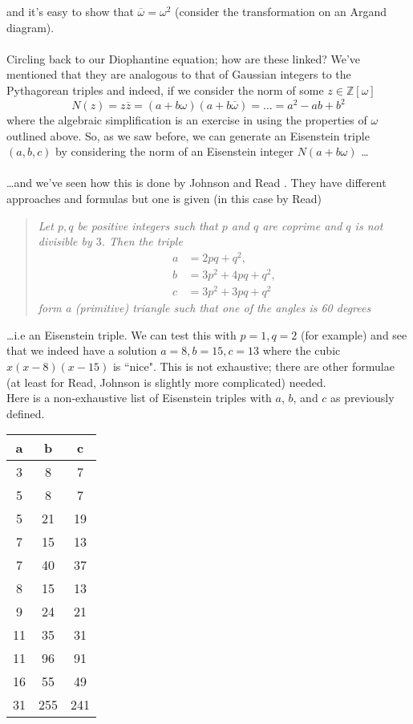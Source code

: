 \documentclass[12pt]{article}
\newcommand*\conj[1]{\overline{#1}}
\newcommand{\Z}{\mathbb{Z}}
\begin{document}
and it's easy to show that $\conj{\omega} = \omega^2$ (consider the transformation on an Argand diagram).\\\\
Circling back to our Diophantine equation; how are these linked? We've mentioned that they are analogous to that of Gaussian integers to the Pythagorean triples and indeed, if we consider the norm of some $z \in \Z[\omega]$
\begin{equation*}
    N(z) = z\conj{z} = (a+b\omega)(a+b\conj{\omega}) = \dots = a^2 - ab + b^2
\end{equation*}
where the algebraic simplification is an exercise in using the properties of $\omega$ outlined above. So, as we saw before, we can generate an Eisenstein triple $(a, b, c)$ by considering the norm of an Eisenstein integer $N(a + b\omega)$ \dots\\\\
\dots and we've seen how this is done by Johnson \cite{johnson2011} and Read \cite{read2006}. They have different approaches and formulas but one is given (in this case by Read)
\begin{quote}
    \textit{Let $p, q$ be positive integers such that $p$ and $q$ are coprime and $q$ is not divisible by $3$. Then the triple
    \begin{align*}
        a &= 2pq + q^2,\\
        b &= 3p^2 + 4pq + q^2,\\
        c &= 3p^2 + 3pq + q^2
    \end{align*}
    form a (primitive) triangle such that one of the angles is 60 degrees}
\end{quote}
\dots i.e an Eisenstein triple. We can test this with $p = 1, q = 2$ (for example) and see that we indeed have a solution $a = 8, b = 15, c= 13$ where the cubic $x(x-8)(x-15)$ is ``nice". This is not exhaustive; there are other formulae (at least for Read, Johnson is slightly more complicated) needed.
\\
Here is a non-exhaustive list of Eisenstein triples with $a$, $b$, and $c$ as previously defined.
\begin{center}
\begin{tabular}{||c c c||} 
 \hline
 a & b & c \\ [0.5ex] 
 \hline\hline
 3 & 8 & 7 \\ 
 \hline
 5 & 8 & 7 \\
 \hline
 5 & 21 & 19 \\
 \hline
 7 & 15 & 13 \\
 \hline
 7 & 40 & 37 \\
 \hline
 8 & 15 & 13 \\
 \hline
 9 & 24 & 21 \\
 \hline
 11 & 35 & 31 \\
 \hline
 11 & 96 & 91 \\
 \hline
 16 & 55 & 49 \\
 \hline
 31 & 255 & 241 \\ [1ex] 
 \hline
\end{tabular}
\end{center}
\end{document}

